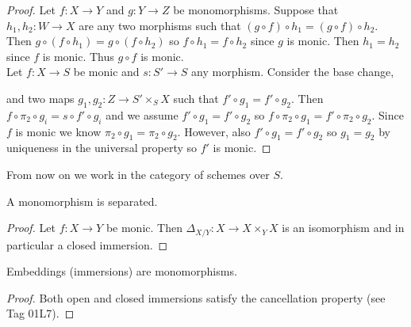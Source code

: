 \documentclass[12pt]{article}
\begin{document}
\begin{proof}
Let $f : X \to Y$ and $g : Y \to Z$ be monomorphisms. Suppose that $h_1, h_2 : W \to X$ are any two morphisms such that $(g \circ f) \circ h_1 = (g \circ f) \circ h_2$. Then $g \circ (f \circ h_1) = g \circ (f \circ h_2)$ so $f \circ h_1 = f \circ h_2$ since $g$ is monic. Then $h_1 = h_2$ since $f$ is monic. Thus $g \circ f$ is monic.
\bigskip\\
Let $f : X \to S$ be monic and $s : S' \to S$ any morphism. Consider the base change,
\begin{center}
\end{center}
and two maps $g_1, g_2 : Z \to S' \times_S X$ such that $f' \circ g_1 = f' \circ g_2$. Then $f \circ \pi_2 \circ g_i = s \circ f' \circ g_i$ and we assume $f' \circ g_1 = f' \circ g_2$ so $f \circ \pi_2 \circ g_1 = f' \circ \pi_2 \circ g_2$. Since $f$ is monic we know $\pi_2 \circ g_1 = \pi_2 \circ g_2$. However, also $f' \circ g_1 = f' \circ g_2$ so $g_1 = g_2$ by uniqueness in the universal property so $f'$ is monic.
\end{proof}

\begin{rmk}
From now on we work in the category of schemes over $S$.
\end{rmk}

\begin{lemma}
A monomorphism is separated.
\end{lemma}

\begin{proof}
Let $f : X \to Y$ be monic. Then $\Delta_{X/Y} : X \to X \times_Y X$ is an isomorphism and in particular a closed immersion.
\end{proof}

\begin{lemma}
Embeddings (immersions) are monomorphisms.
\end{lemma}

\begin{proof}
Both open and closed immersions satisfy the cancellation property (see Tag 01L7).
\end{proof}
\end{document}
